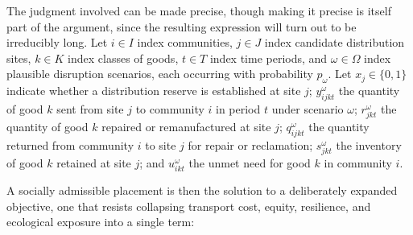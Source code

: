\documentclass[11pt,oneside]{book}
\begin{document}
The judgment involved can be made precise, though making it precise is itself part of the argument, since the resulting expression will turn out to be irreducibly long. Let $i \in I$ index communities, $j \in J$ index candidate distribution sites, $k \in K$ index classes of goods, $t \in T$ index time periods, and $\omega \in \Omega$ index plausible disruption scenarios, each occurring with probability $p_\omega$. Let $x_j \in \{0,1\}$ indicate whether a distribution reserve is established at site $j$; $y_{ijkt}^{\omega}$ the quantity of good $k$ sent from site $j$ to community $i$ in period $t$ under scenario $\omega$; $r_{jkt}^{\omega}$ the quantity of good $k$ repaired or remanufactured at site $j$; $q_{ijkt}^{\omega}$ the quantity returned from community $i$ to site $j$ for repair or reclamation; $s_{jkt}^{\omega}$ the inventory of good $k$ retained at site $j$; and $u_{ikt}^{\omega}$ the unmet need for good $k$ in community $i$.

A socially admissible placement is then the solution to a deliberately expanded objective, one that resists collapsing transport cost, equity, resilience, and ecological exposure into a single term:
\end{document}
